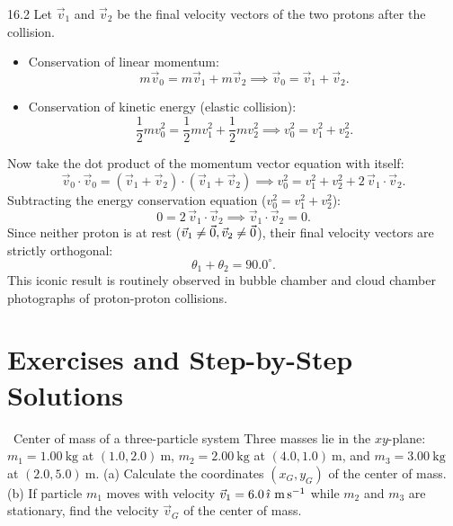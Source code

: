 \begin{solution}{16.2}
Let $\vec{v}_1$ and $\vec{v}_2$ be the final velocity vectors of the two protons after the collision.
\begin{itemize}[leftmargin=1.4em,itemsep=2pt]
  \item Conservation of linear momentum:
        \[
        m\vec{v}_0 = m\vec{v}_1 + m\vec{v}_2 \implies \vec{v}_0 = \vec{v}_1 + \vec{v}_2.
        \]
  \item Conservation of kinetic energy (elastic collision):
        \[
        \frac{1}{2}m v_0^2 = \frac{1}{2}m v_1^2 + \frac{1}{2}m v_2^2 \implies v_0^2 = v_1^2 + v_2^2.
        \]
\end{itemize}
Now take the dot product of the momentum vector equation with itself:
\[
\vec{v}_0\cdot\vec{v}_0 = (\vec{v}_1 + \vec{v}_2)\cdot(\vec{v}_1 + \vec{v}_2) \implies v_0^2 = v_1^2 + v_2^2 + 2\,\vec{v}_1\cdot\vec{v}_2.
\]
Subtracting the energy conservation equation ($v_0^2 = v_1^2 + v_2^2$):
\[
0 = 2\,\vec{v}_1\cdot\vec{v}_2 \implies \boxed{\vec{v}_1\cdot\vec{v}_2 = 0.}
\]
Since neither proton is at rest ($\vec{v}_1\ne\vec{0}, \vec{v}_2\ne\vec{0}$), their final velocity vectors are strictly orthogonal:
\[
\theta_1 + \theta_2 = \mathbf{90.0^\circ.}
\]
This iconic result is routinely observed in bubble chamber and cloud chamber photographs of proton-proton collisions.
\end{solution}

\section{Exercises and Step-by-Step Solutions}

\begin{exercise}{\warm\ Center of mass of a three-particle system}
Three masses lie in the $xy$-plane: $m_1 = 1.00\ \mathrm{kg}$ at $(1.0, 2.0)\ \mathrm{m}$, $m_2 = 2.00\ \mathrm{kg}$ at $(4.0, 1.0)\ \mathrm{m}$, and $m_3 = 3.00\ \mathrm{kg}$ at $(2.0, 5.0)\ \mathrm{m}$.
(a) Calculate the coordinates $(x_G, y_G)$ of the center of mass.
(b) If particle $m_1$ moves with velocity $\vec{v}_1 = 6.0\,\ihat\ \mathrm{m\,s^{-1}}$ while $m_2$ and $m_3$ are stationary, find the velocity $\vec{v}_G$ of the center of mass.
\end{exercise}

\begin{tabletworkspace}[5.0cm]
\end{tabletworkspace}

